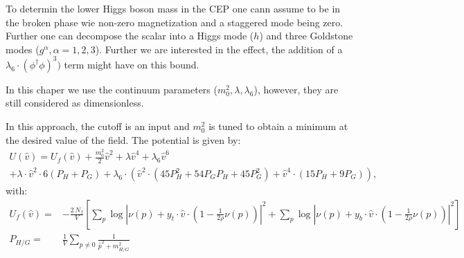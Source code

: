 To determin the lower Higgs boson mass in the CEP one cann assume to be in the broken phase wie non-zero
magnetization and a staggered mode being zero. Further one can decompose the scalar into a Higgs mode ($h$) and three 
Goldstone modes ($g^{\alpha}, \alpha=1,2,3$). Further we are interested in the effect, the addition of a $\lambda_6 \cdot (\phi^{\dagger}\phi)^3)$ term
might have on this bound.

In this chaper we use the continuum parameters ($m_0^2, \lambda, \lambda_6$), however, they are still considered as dimensionless.

In this approach, the cutoff is an input and $m_0^2$ is tuned to obtain a minimum at the desired value of the field. The potential is given by:
\begin{multline}\label{eq:CEP_lowerBound_with_phi_6}
 U(\hat v) = U_f(\hat v) + \frac{m_0^2}{2} {\hat v}^2 +\lambda {\hat v}^4 + \lambda_6 {\hat v}^6 \\
                         + \lambda \cdot {\hat v}^2 \cdot 6(P_H+P_G)
                         + \lambda_6 \cdot \left( {\hat v}^2 \cdot ( 45 P_H^2 + 54 P_G P_H + 45 P_G^2)
                         + {\hat v}^4 \cdot ( 15 P_H + 9 P_G ) \right ),
\end{multline}
with:
\begin{align}
 \label{eq:fermionic_contribution_CEP_massbound}
 U_f(\hat v) =& -\frac{2\, N_f}{V} \left[
                 \sum\limits_p \log\left| \nu(p) + y_t \cdot \hat v \cdot \left( 1-\frac{1}{2 \rho} \nu(p) \right) \right|^2 +
                 \sum\limits_p \log\left| \nu(p) + y_b \cdot \hat v \cdot \left( 1-\frac{1}{2 \rho} \nu(p) \right) \right|^2 \right] \\
 \label{eq:def_propagator_sums}
 P_{H/G} =& \frac{1}{V} \sum\limits_{p \neq 0} \frac{1}{{\hat p}^2 + m_{H/G}^2}
\end{align}

